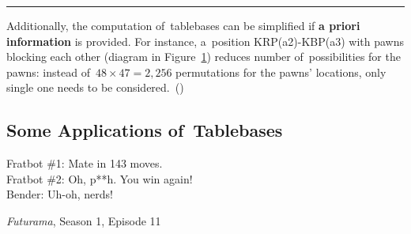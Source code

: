 \hrule
\medskip

Additionally, the computation of~tablebases can be simplified if \textbf{a priori information} is provided.
For instance, a~position KRP(a2)-KBP(a3) with pawns blocking each other (diagram in Figure~\ref{fig:KRP(a2)-KBP(a3)}) reduces number of~possibilities for the pawns:
instead of~$48 \times 47 = 2,256$ permutations for the pawns' locations, only single one needs to be considered.~(\cite{Herik1987sixmenendgame})
\begin{figure}[H]
  \centering
  \newgame
  \showboard
  \label{fig:KRP(a2)-KBP(a3)}
\end{figure}

\subsection{Some Applications of~Tablebases}
\epigraph{
  Fratbot \#1: Mate in 143 moves. \\
  Fratbot \#2: Oh, p**h. You win again! \\
  Bender: Uh-oh, nerds!
}{\emph{Futurama}, Season 1, Episode 11}
